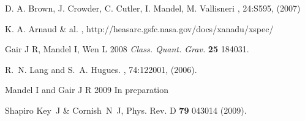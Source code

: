 \documentclass{iopart}
\begin{document}
\begin{thebibliography}{99}
D. A. Brown, J. Crowder, C. Cutler, I. Mandel, M. Vallisneri
, 24:{S595}, (2007)  

K. A. Arnaud \& al.
, http://heasarc.gsfc.nasa.gov/docs/xanadu/xspec/ 

Gair J R, Mandel I, Wen L 2008 {\em Class. Quant. Grav.} \textbf{25} 184031.

R.~N. Lang and S.~A. Hugues.
, 74:122001, (2006).

Mandel I and Gair J R 2009 In preparation

 Shapiro Key~J \& Cornish~N~J, Phys. Rev. D {\bf 79} 043014 (2009).

\end{thebibliography}
\end{document}
